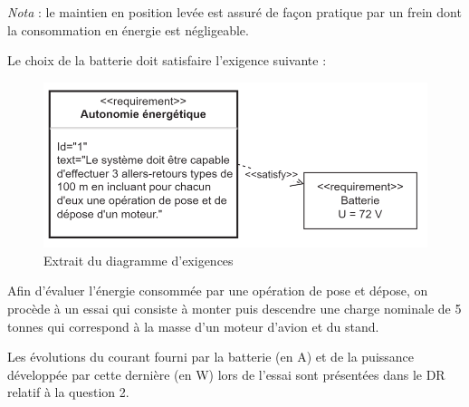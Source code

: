 \textit{Nota} : le maintien en position levée est assuré de façon pratique par un frein dont la consommation en énergie est négligeable.

\newpage

Le choix de la batterie doit satisfaire l'exigence suivante :
\begin{figure}[ht!]
\begin{center}
 \includegraphics[width=0.5\linewidth]{img/fig06}
\end{center}
\caption{\label{fig06} Extrait du diagramme d'exigences}
\end{figure}

Afin d'évaluer l'énergie consommée par une opération de pose et dépose, on procède à un essai qui consiste à monter puis descendre une charge nominale de 5 tonnes qui correspond à la masse d'un moteur d'avion et du stand.

Les évolutions du courant fourni par la batterie (en A) et de la puissance développée par cette dernière (en W) lors de l'essai sont présentées dans le DR relatif à la question 2.


